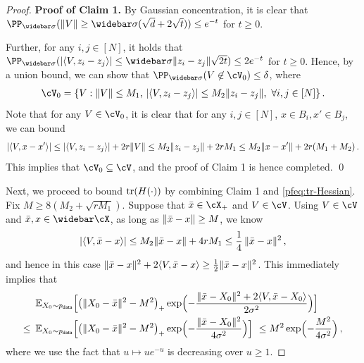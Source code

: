 \begin{proof}
\textbf{Proof of Claim 1.}
By Gaussian concentration, it is clear that $\PP_{\sigbar}(\nrm{V}\geq \sigbar(\sqrt{d}+2\sqrt{t}))\leq e^{-t}$ for $t\geq 0$.

Further, for any $i,j\in[N]$, it holds that $\PP_{\sigbar}(\abs{\tri{V,z_i-z_j}}\leq \sigbar\nrm{z_i-z_j}\sqrt{2t})\leq 2e^{-t}$ for $t\geq 0$. Hence, by a union bound, we can show that $\PP_{\sigbar}(V\not \in\cV_0)\leq \delta$, where
\begin{align*}
    \cV_0=\crl{V: \nrm{V}\leq M_1,\, \abs{\tri{V,z_i-z_j}}\leq M_2\nrm{z_i-z_j},~\forall i,j\in[N]}\,.
\end{align*}
Note that for any $V\in\cV_0$, it is clear that for any $i,j\in[N]$, $x\in B_i, x'\in B_j$, we can bound 
\begin{align*}
    \abs{\tri{V,x-x'}}
    \leq \abs{\tri{V,z_i-z_j}}+2r\nrm{V}
    \leq M_2\nrm{z_i-z_j}+2rM_1 
    \leq M_2\nrm{x-x'}+2r(M_1+M_2)\,.
\end{align*}
This implies that $\cV_0\subseteq \cV$, and the proof of Claim 1 is hence completed.
\qed

Next, we proceed to bound $\tr(H(\cdot))$ by combining Claim 1 and \cref{pfeq:tr-Hessian}. Fix $M\geq 8(M_2+\sqrt{rM_1})$.
Suppose that $\xbar\in\cX_+$ and $V\in\cV$.
Using $V\in\cV$ and $\xbar,x\in\cXbar$, as long as $\nrm{\xbar-x}\geq M$, we know
\begin{align*}
    \abs{\tri{V,\xbar-x}}
    \leq M_2\nrm{\xbar-x}+4rM_1\leq \frac{1}{4}\,\nrm{\xbar-x}^2\,,
\end{align*}
and hence in this case $\nrm{\xbar-x}^2+2\tri{V,\xbar-x}\geq \frac{1}{2}\nrm{\xbar-x}^2$. This immediately implies that 
\begin{align*}
    &~\En_{X_0\sim \pdata}\brk[\Big]{ \prn[\big]{\nrm{X_0-\xbar}^2-M^2}_+\exp\prn[\Big]{-\frac{\nrm{\xbar-X_0}^2+2\tri{V,\xbar-X_0}}{2\sigma^2}} } \\
    \leq&~ \En_{X_0\sim \pdata}\brk[\Big]{ \prn*{\nrm{X_0-\xbar}^2-M^2}_+\exp\prn[\Big]{-\frac{\nrm{\xbar-X_0}^2}{4\sigma^2}} }\
    \leq M^2\exp\prn[\Big]{-\frac{M^2}{4\sigma^2}}\,,
\end{align*}
where we use the fact that $u\mapsto ue^{-u}$ is decreasing over $u\geq 1$.


\end{proof}
